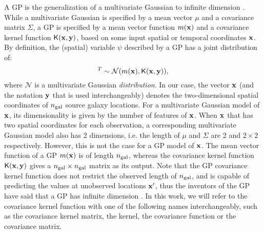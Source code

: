 A GP is the generalization of a multivariate Gaussian 
to infinite dimension \citep{Rasmussen2006}. While a multivariate Gaussian is
specified by a mean vector $\mu$ and a covariance matrix $\Sigma$, 
a GP is specified by a mean vector function $m(\mathbf{x})$ and a
covariance kernel function $\mathsf{K}(\mathbf{x}, \mathbf{y})$, based on some input spatial or
temporal coordinates $\mathbf{x}$. 
By definition, the (spatial) variable $\psi$ described by a GP has a joint distribution of:
\begin{equation}
	[\psi_1, \psi_2, \ldots, \psi_m ]^T \sim \mathcal{N}(m(\xv),
	\kerngp(\xv, \yv)),\label{eq:GP_joint_distribution}
\end{equation}
where $\mathcal{N}$ is a multivariate Gaussian {\it distribution}.
In our case, the vector $\mathbf{x}$ (and the
notation $\mathbf{y}$ that is used interchangeably) denotes the
two-dimensional spatial coordinates of $n_{\rm gal}$ source galaxy locations. 
For a multivariate Gaussian model of $\mathbf{x}$, 
its dimensionality is given by the number of features of $\mathbf{x}$.
When $\mathbf{x}$ that has two spatial coordinates for each observation, 
a corresponding multivariate Gaussian model also has 2 dimensions, 
i.e. the length of $\mu$ and $\Sigma$ are 2 and $2 \times 2$ respectively. 
However, this is not the case for a GP model of $\mathbf{x}$. 
The mean vector function of a GP $m(\mathbf{x})$ is of length $n_{\rm gal}$, 
whereas the covariance kernel function $\mathsf{K}(\mathbf{x}, \mathbf{y})$
gives a $n_{\rm gal} \times n_{\rm gal}$ matrix as its output.
Note that the GP covariance kernel function does not restrict the 
observed length of $n_{\rm gal}$, and is capable of predicting the values at
unobserved locations $\mathbf{x}'$, thus the inventors of the GP 
have said that a GP has infinite dimension \citep{Rasmussen2006}. 
In this work, we will refer to the covariance kernel function with one of 
the following names interchangeably, such as the 
covariance kernel matrix, the kernel, the covariance
function or the covariance matrix. 

